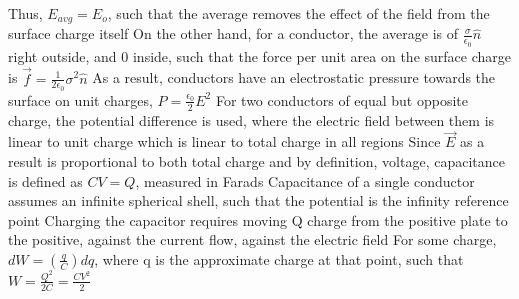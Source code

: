 \documentclass[11 pt, twoside]{article}
\newenvironment{outline*}
{
	\begin{outline}[enumerate]
	}
	{\end{outline}
}
\begin{document}
\begin{outline*}
			\4 Thus, $E_{avg} = E_o$, such that the average removes the effect of the field from the surface charge itself
		\3 On the other hand, for a conductor, the average is of $\frac{\sigma}{\epsilon_0}\hat{n}$ right outside, and 0 inside, such that the force per unit area on the surface charge is $\vec{f} = \frac{1}{2\epsilon_0}\sigma^2\hat{n}$
			\4 As a result, conductors have an electrostatic pressure towards the surface on unit charges, $P = \frac{\epsilon_0}{2}E^2$
	\2 For two conductors of equal but opposite charge, the potential difference is used, where the electric field between them is linear to unit charge which is linear to total charge in all regions
		\3 Since $\vec{E}$ as a result is proportional to both total charge and by definition, voltage, capacitance is defined as $CV = Q$, measured in Farads
		\3 Capacitance of a single conductor assumes an infinite spherical shell, such that the potential is the infinity reference point
		\3 Charging the capacitor requires moving Q charge from the positive plate to the positive, against the current flow, against the electric field
			\4 For some charge, $dW = (\frac{q}{C})dq$, where q is the approximate charge at that point, such that $W = \frac{Q^2}{2C} = \frac{CV^2}{2}$
\end{outline*}
\end{document}
